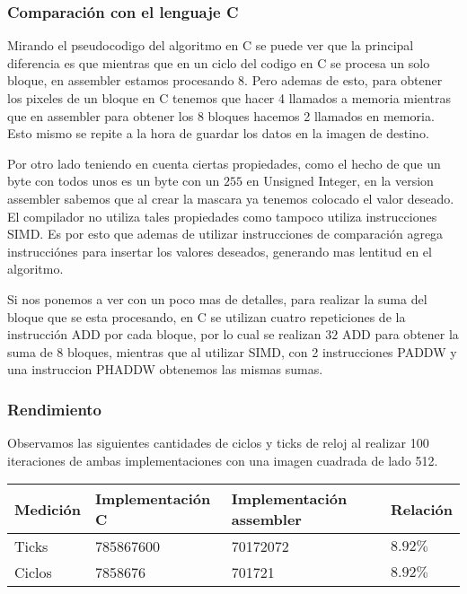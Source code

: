\subsubsection{Comparación con el lenguaje C}
Mirando el pseudocodigo del algoritmo en C se puede ver que la principal diferencia es que mientras que en un ciclo del codigo en C se procesa un solo bloque, en assembler estamos procesando 8. Pero ademas de esto, para obtener los pixeles de un bloque en C tenemos que hacer 4 llamados a memoria mientras que en assembler para obtener los 8 bloques hacemos 2 llamados en memoria.	Esto mismo se repite a la hora de guardar los datos en la imagen de destino.

Por otro lado teniendo en cuenta ciertas propiedades, como el hecho de que un byte con todos unos es un byte con un $255$ en Unsigned Integer, en la version assembler sabemos que al crear la mascara ya tenemos colocado el valor deseado. El compilador no utiliza tales propiedades como tampoco utiliza instrucciones SIMD. Es por esto que ademas de utilizar instrucciones de comparación agrega instrucciónes para insertar los valores deseados, generando mas lentitud en el algoritmo. 

Si nos ponemos a ver con un poco mas de detalles, para realizar la suma del bloque que se esta procesando, en C se utilizan cuatro repeticiones de la instrucción ADD por cada bloque, por lo cual se realizan $32$ ADD para obtener la suma de 8 bloques, mientras que al utilizar SIMD, con 2 instrucciones PADDW y una instruccion PHADDW obtenemos las mismas sumas.

\subsubsection{Rendimiento}

Observamos las siguientes cantidades de ciclos y ticks de reloj al realizar 100 iteraciones de ambas implementaciones con una imagen cuadrada de lado 512.
\begin{center}
    \begin{tabular}{|l|l|l|l|}
        \hline
        Medición & Implementación C & Implementación assembler & Relación \\
        \hline
        Ticks    & 785867600      & 70172072               & $8.92\%$ \\
        Ciclos   & 7858676        & 701721                 & $8.92\%$ \\
        \hline
    \end{tabular}
\end{center}